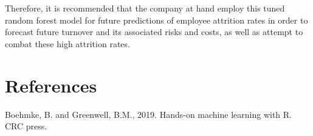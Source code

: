 \documentclass[11pt,preprint, authoryear]{elsarticle}
\numberwithin{equation}{section}
\numberwithin{figure}{section}
\numberwithin{table}{section}
\begin{document}
Therefore, it is recommended that the company at hand employ this tuned
random forest model for future predictions of employee attrition rates
in order to forecast future turnover and its associated risks and costs,
as well as attempt to combat these high attrition rates.

\newpage

\hypertarget{references}{%
\section*{References}\label{references}}

Boehmke, B. and Greenwell, B.M., 2019. Hands-on machine learning with R.
CRC press.


\end{document}

